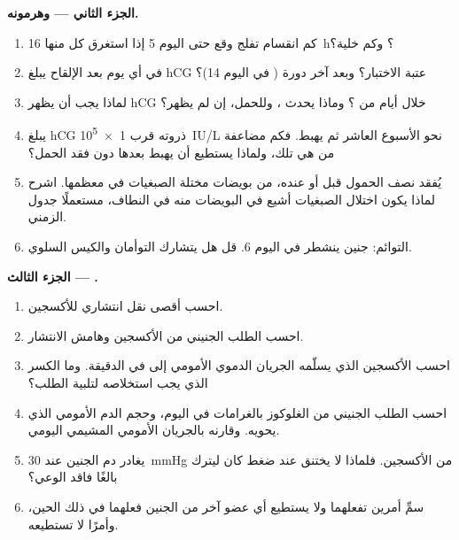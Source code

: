 \begin{problem}
\medskip
\noindent\textbf{الجزء الثاني ---  وهرمونه.}
\begin{enumerate}[resume]
  \item كم انقسام تفلج وقع حتى اليوم 5 إذا استغرق كل منها
        \qty{16}{h}؟ وكم خلية؟
  \item في أي يوم بعد الإلقاح يبلغ hCG عتبة الاختبار؟ وبعد
        آخر دورة ( في اليوم 14)؟
  \item لماذا يجب أن يظهر hCG خلال أيام من ؟ وماذا
        يحدث ، وللحمل، إن لم يظهر؟
  \item يبلغ hCG ذروته قرب \qty{1e5}{IU/L} نحو الأسبوع العاشر ثم يهبط.
        فكم مضاعفة من  هي تلك، ولماذا يستطيع أن
        يهبط بعدها دون فقد الحمل؟
  \item يُفقد نصف الحمول قبل  أو عنده، من بويضات
        مختلة الصبغيات في معظمها. اشرح لماذا يكون اختلال الصبغيات
        أشيع في البويضات منه في النطاف، مستعملًا جدول
         الزمني.
  \item التوائم: جنين ينشطر في اليوم 6. قل هل يتشارك
        التوأمان  والكيس السلوي.
\end{enumerate}

\medskip
\noindent\textbf{الجزء الثالث --- .}
\begin{enumerate}[resume]
  \item احسب أقصى نقل انتشاري للأكسجين.
  \item احسب الطلب الجنيني من الأكسجين وهامش الانتشار.
  \item احسب الأكسجين الذي يسلّمه الجريان الدموي الأمومي إلى
         في الدقيقة. وما الكسر الذي يجب استخلاصه
        لتلبية الطلب؟
  \item احسب الطلب الجنيني من الغلوكوز بالغرامات في اليوم،
        وحجم الدم الأمومي الذي يحويه. وقارنه بالجريان الأمومي
        المشيمي اليومي.
  \item يغادر دم الجنين  عند \qty{30}{mmHg} من
        الأكسجين. فلماذا لا يختنق عند ضغط كان ليترك بالغًا
        فاقد الوعي؟
  \item سمِّ أمرين تفعلهما  ولا يستطيع أي عضو آخر من
        الجنين فعلهما في ذلك الحين، وأمرًا لا تستطيعه.
\end{enumerate}


\end{problem}
